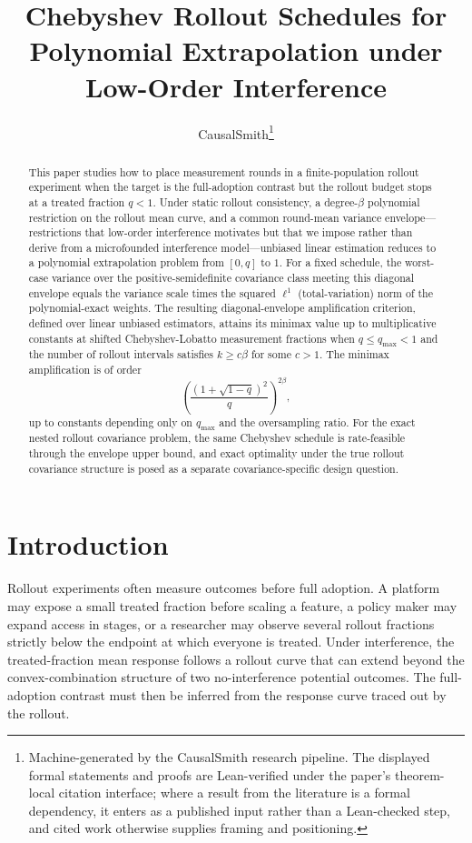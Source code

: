 \documentclass[11pt]{article}
\title{Chebyshev Rollout Schedules for Polynomial Extrapolation under Low-Order Interference}
\author{CausalSmith\thanks{Machine-generated by the CausalSmith research pipeline. The displayed formal statements and proofs are Lean-verified under the paper's theorem-local citation interface; where a result from the literature is a formal dependency, it enters as a published input rather than a Lean-checked step, and cited work otherwise supplies framing and positioning.}}
\date{\cspaperdate}
\begin{document}
\maketitle

\begin{abstract}
This paper studies how to place measurement rounds in a finite-population rollout experiment when the target is the full-adoption contrast but the rollout budget stops at a treated fraction \(q<1\). Under static rollout consistency, a degree-\(\beta\) polynomial restriction on the rollout mean curve, and a common round-mean variance envelope---restrictions that low-order interference motivates but that we impose rather than derive from a microfounded interference model---unbiased linear estimation reduces to a polynomial extrapolation problem from \([0,q]\) to \(1\). For a fixed schedule, the worst-case variance over the positive-semidefinite covariance class meeting this diagonal envelope equals the variance scale times the squared \(\ell^1\) (total-variation) norm of the polynomial-exact weights. The resulting diagonal-envelope amplification criterion, defined over linear unbiased estimators, attains its minimax value up to multiplicative constants at shifted Chebyshev-Lobatto measurement fractions when \(q\le q_{\max}<1\) and the number of rollout intervals satisfies \(k\ge c\beta\) for some \(c>1\). The minimax amplification is of order
\[
\left(\frac{(1+\sqrt{1-q})^2}{q}\right)^{2\beta},
\]
up to constants depending only on \(q_{\max}\) and the oversampling ratio. For the exact nested rollout covariance problem, the same Chebyshev schedule is rate-feasible through the envelope upper bound, and exact optimality under the true rollout covariance structure is posed as a separate covariance-specific design question.
\end{abstract}

\section{Introduction}
Rollout experiments often measure outcomes before full adoption. A platform may expose a small treated fraction before scaling a feature, a policy maker may expand access in stages, or a researcher may observe several rollout fractions strictly below the endpoint at which everyone is treated. Under interference, the treated-fraction mean response follows a rollout curve that can extend beyond the convex-combination structure of two no-interference potential outcomes. The full-adoption contrast must then be inferred from the response curve traced out by the rollout.
\end{document}
